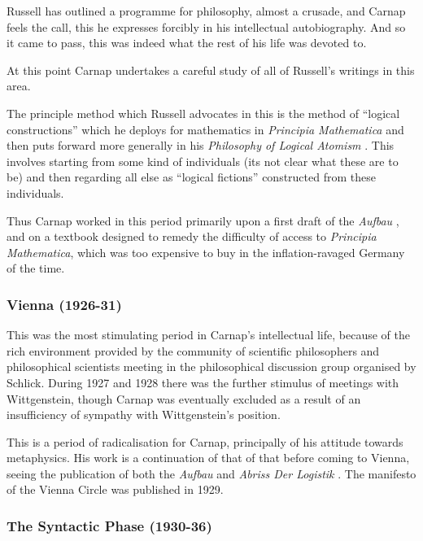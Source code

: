 \documentclass[10pt,titlepage]{book}
\newcommand{\ignore}[1]{}
\begin{document}
Russell has outlined a programme for philosophy, almost a crusade, and Carnap feels the call, this he expresses forcibly in his intellectual autobiography.
And so it came to pass, this was indeed what the rest of his life was devoted to.

At this point Carnap undertakes a careful study of all of Russell's writings in this area.

The principle method which Russell advocates in this is the method of ``logical constructions'' which he deploys for mathematics in \emph{Principia Mathematica} \cite{russell10} and then puts forward more generally in his \emph{Philosophy of Logical Atomism} \cite{russellPLA}\ignore{\cite{russell1956}}.
This involves starting from some kind of individuals (its not clear what these are to be) and then regarding all else as ``logical fictions'' constructed from these individuals.

Thus Carnap worked in this period primarily upon a first draft of the \emph{Aufbau} \cite{carnap28}, and on a textbook \cite{carnap29} designed to remedy the difficulty of access to \emph{Principia Mathematica}, which was too expensive to buy in the inflation-ravaged Germany of the time.

\subsubsection{Vienna (1926-31)}

This was the most stimulating period in Carnap's intellectual life, because of the rich environment provided by the community of scientific philosophers and philosophical scientists meeting in the philosophical discussion group organised by Schlick.
During 1927 and 1928 there was the further stimulus of meetings with Wittgenstein, though Carnap was eventually excluded as a result of an insufficiency of sympathy with Wittgenstein's position.

This is a period of radicalisation for Carnap, principally of his attitude towards metaphysics.
His work is a continuation of that of that before coming to Vienna, seeing the publication of both the \emph{Aufbau} \cite{carnap28} and \emph{Abriss Der Logistik} \cite{carnap29}.
The manifesto of the Vienna Circle \cite{carnap29b} was published in 1929.

\subsubsection{The Syntactic Phase (1930-36)}
\end{document}
